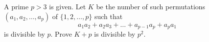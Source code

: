 A prime $p>3$ is given. Let $K$ be the number of such permutations $(a_1, a_2, \ldots, a_p)$ of $\{ 1, 2, \ldots, p\}$ such that
$$a_1a_2+a_2a_3+\ldots + a_{p-1}a_p+a_pa_1$$is divisible by $p$. Prove $K+p$ is divisible by $p^2$.
